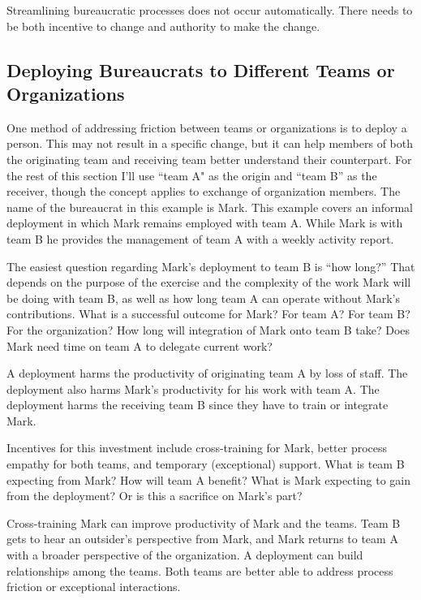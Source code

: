 Streamlining bureaucratic processes does not occur automatically. There needs to be both incentive to change and authority to make the change. 

\subsection*{Deploying Bureaucrats to Different Teams or Organizations\label{sec:prisoner-exchange}}

One method of addressing friction between teams or organizations is to deploy a person. This may not result in a specific change, but it can help members of both the originating team and receiving team better understand their counterpart. For the rest of this section I'll use ``team A" as the origin and ``team B'' as the receiver, though the concept applies to exchange of organization members. The name of the bureaucrat in this example is Mark. This example covers an informal deployment in which Mark remains employed with team A. While Mark is with team B he provides the management of team A with a weekly activity report. 

The easiest question regarding Mark's deployment to team B is ``how long?'' That depends on the purpose of the exercise and the complexity of the work Mark will be doing with team B, as well as how long team A can operate without Mark's contributions. What is a successful outcome for Mark? For team A? For team B? For the organization? How long will integration of Mark onto team B take? Does Mark need time on team A to delegate current work?

A deployment harms the productivity of originating team A by loss of staff. The deployment also harms Mark's productivity for his work with team A. The deployment harms the receiving team B since they have to train or integrate Mark. 

Incentives for this investment include cross-training for Mark, better process empathy for both teams, and temporary (exceptional) support. What is team B expecting from Mark? How will team A benefit? What is Mark expecting to gain from the deployment? Or is this a sacrifice on Mark's part? 

Cross-training Mark can improve productivity of Mark and the teams. 
Team B gets to hear an outsider's perspective from Mark, and Mark returns to team A with a broader perspective of the organization.
A deployment can build relationships among the teams. Both teams are better able to address process friction or exceptional interactions. 


